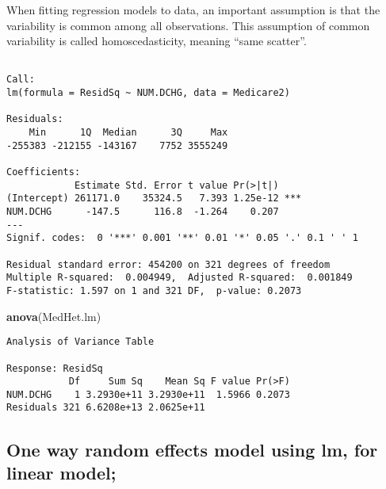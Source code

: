 \documentclass[]{book}
\newenvironment{Shaded}{\begin{snugshade}}{\end{snugshade}}
\newcommand{\DataTypeTok}[1]{\textcolor[rgb]{0.13,0.29,0.53}{#1}}
\newcommand{\KeywordTok}[1]{\textcolor[rgb]{0.13,0.29,0.53}{\textbf{#1}}}
\newcommand{\NormalTok}[1]{#1}
\newcommand{\OperatorTok}[1]{\textcolor[rgb]{0.81,0.36,0.00}{\textbf{#1}}}
\newcommand{\StringTok}[1]{\textcolor[rgb]{0.31,0.60,0.02}{#1}}
\begin{document}
When fitting regression models to data, an important assumption is that the variability is common among all observations. This assumption of common variability is called homoscedasticity, meaning ``same scatter''.

\begin{Shaded}
\end{Shaded}

\begin{verbatim}

Call:
lm(formula = ResidSq ~ NUM.DCHG, data = Medicare2)

Residuals:
    Min      1Q  Median      3Q     Max 
-255383 -212155 -143167    7752 3555249 

Coefficients:
            Estimate Std. Error t value Pr(>|t|)    
(Intercept) 261171.0    35324.5   7.393 1.25e-12 ***
NUM.DCHG      -147.5      116.8  -1.264    0.207    
---
Signif. codes:  0 '***' 0.001 '**' 0.01 '*' 0.05 '.' 0.1 ' ' 1

Residual standard error: 454200 on 321 degrees of freedom
Multiple R-squared:  0.004949,  Adjusted R-squared:  0.001849 
F-statistic: 1.597 on 1 and 321 DF,  p-value: 0.2073
\end{verbatim}

\begin{Shaded}
\begin{Highlighting}[]
\KeywordTok{anova}\NormalTok{(MedHet.lm)}
\end{Highlighting}
\end{Shaded}

\begin{verbatim}
Analysis of Variance Table

Response: ResidSq
           Df     Sum Sq    Mean Sq F value Pr(>F)
NUM.DCHG    1 3.2930e+11 3.2930e+11  1.5966 0.2073
Residuals 321 6.6208e+13 2.0625e+11               
\end{verbatim}

\hypertarget{one-way-random-effects-model-using-lm-for-linear-model}{%
\subsection{One way random effects model using lm, for linear model;}\label{one-way-random-effects-model-using-lm-for-linear-model}}
\end{document}

